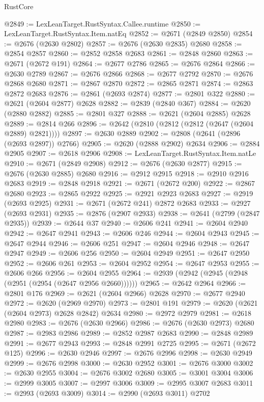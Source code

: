\begin{lexlean}{RustCore}
\begin{coremodule}
@2849 := LexLeanTarget.RustSyntax.Callee.runtime
@2850 := LexLeanTarget.RustSyntax.Item.natEq
@2852 := @2671 (@2849 @2850)
@2854 := @2676 (@2630 @2802)
@2857 := @2676 (@2630 @2835) @2680
@2858 := @2854 @2857
@2860 := @2852 @2858 @2683
@2861 := @2848 @2860
@2863 := @2671 (@2672 @191)
@2864 := @2677 @2786
@2865 := @2676 @2864
@2866 := @2630 @2789
@2867 := @2676 @2866
@2868 := @2677 @2792
@2870 := @2676 @2868 @2680
@2871 := @2867 @2870
@2872 := @2865 @2871
@2874 := @2863 @2872 @2683
@2876 := @2861 (@2693 @2874)
@2877 := @2801 @322
@2880 := @2621 (@2604 @2877) @2628
@2882 := @2839 (@2840 @367)
@2884 := @2620 (@2880 @2882)
@2885 := @2801 @327
@2888 := @2621 (@2604 @2885) @2628
@2889 := @2814 @266
@2896 := @2642 (@2810 (@2812 (@2812 (@2647 (@2604 @2889) @2821))))
@2897 := @2630 @2889
@2902 := @2808 (@2641 (@2896 (@2693 @2897)) @2766)
@2905 := @2620 (@2888 @2902) @2634
@2906 := @2884 @2905
@2907 := @2618 @2906
@2908 := LexLeanTarget.RustSyntax.Item.natLe
@2910 := @2671 (@2849 @2908)
@2912 := @2676 (@2630 @2877)
@2915 := @2676 (@2630 @2885) @2680
@2916 := @2912 @2915
@2918 := @2910 @2916 @2683
@2919 := @2848 @2918
@2921 := @2671 (@2672 @200)
@2922 := @2867 @2680
@2923 := @2865 @2922
@2925 := @2921 @2923 @2683
@2927 := @2919 (@2693 @2925)
@2931 := @2671 (@2672 @241) @2872 @2683
@2933 := @2927 (@2693 @2931)
@2935 := @2876 (@2907 @2933)
@2938 := @2641 (@2799 (@2847 @2935))
@2939 := @2644 @37
@2940 := @2606 @241
@2941 := @2604 @2940
@2942 := @2647 @2941
@2943 := @2606 @246
@2944 := @2604 @2943
@2945 := @2647 @2944
@2946 := @2606 @251
@2947 := @2604 @2946
@2948 := @2647 @2947
@2949 := @2606 @256
@2950 := @2604 @2949
@2951 := @2647 @2950
@2952 := @2606 @261
@2953 := @2604 @2952
@2954 := @2647 @2953
@2955 := @2606 @266
@2956 := @2604 @2955
@2964 := @2939 (@2942 (@2945 (@2948 (@2951 (@2954 (@2647 @2956 @2660))))))
@2965 := @2642 @2964
@2966 := @2801 @176
@2969 := @2621 (@2604 @2966) @2628
@2970 := @2677 @2940
@2972 := @2620 (@2969 @2970)
@2973 := @2801 @191
@2979 := @2620 (@2621 (@2604 @2973) @2628 @2842) @2634
@2980 := @2972 @2979
@2981 := @2618 @2980
@2983 := @2676 (@2630 @2966)
@2986 := @2676 (@2630 @2973) @2680
@2987 := @2983 @2986
@2989 := @2852 @2987 @2683
@2990 := @2848 @2989
@2991 := @2677 @2943
@2993 := @2848 @2991 @2725
@2995 := @2671 (@2672 @125)
@2996 := @2630 @2946
@2997 := @2676 @2996
@2998 := @2630 @2949
@2999 := @2676 @2998
@3000 := @2630 @2952
@3001 := @2676 @3000
@3002 := @2630 @2955
@3004 := @2676 @3002 @2680
@3005 := @3001 @3004
@3006 := @2999 @3005
@3007 := @2997 @3006
@3009 := @2995 @3007 @2683
@3011 := @2993 (@2693 @3009)
@3014 := @2990 (@2693 @3011) @2702

\end{coremodule}
\end{lexlean}
